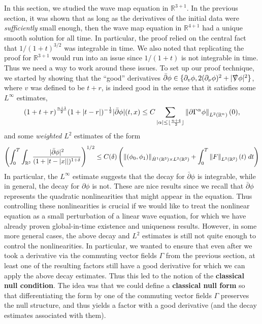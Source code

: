 \documentclass{article}
\begin{document}
	In this section, we studied the wave map equation in $\mathbb{R}^{3 + 1}$. In the previous section, it was shown that as long as the derivatives of the initial data were \textit{sufficiently} small enough, then the wave map equation in $\mathbb{R}^{4 + 1}$ had a unique smooth solution for all time. In particular, the proof relied on the central fact that $1/(1 + t)^{3/2}$ was integrable in time. We also noted that replicating the proof for $\mathbb{R}^{3 + 1}$ would run into an issue since $1/(1 + t)$ is not integrable in time. Thus we need a way to work around these issues. To set up our proof technique, we started by showing that the ``good'' derivatives $\bar{\partial}\phi \in \{\partial_{v}\phi, 2(\partial_{\nu}\phi)^{2} + |\slashed{\nabla}\phi|^{2}\}$, where $v$ was defined to be $t + r$, is indeed good in the sense that it satisfies some $L^{\infty}$ estimates, 
	\begin{equation*}
		(1 + t + r)^{\frac{n + 1}{2}}(1 + |t - r|)^{-\frac{1}{2}}|\bar{\partial}\phi|(t, x) \leq C \sum_{|\alpha|\leq \lfloor \frac{n + 4}{2}\rfloor}\left\Vert \partial\Gamma^{\alpha}\phi \right\Vert_{L^{2}(\mathbb{R}^{n})}(0), 
	\end{equation*} 
	and some \textit{weighted} $L^{2}$ estimates of the form 
	\begin{equation*}
		\left(\int_{0}^{T}\int_{\mathbb{R}^{3}}\frac{|\bar\partial\phi|^{2}}{(1 + |t - |x||)^{1 + \delta}}\right)^{1/2}\leq C(\delta)\left(\left\Vert (\phi_{0}, \phi_{1}) \right\Vert_{\dot{H}^{1}(\mathbb{R}^{3}) \times L^{2}(\mathbb{R}^{3})} + \int_{0}^{T}\left\Vert F \right\Vert_{L^{2}(\mathbb{R}^{3})}(t)\;dt\right)
	\end{equation*}  
	In particular, the $L^{\infty}$ estimate suggests that the decay for $\bar{\partial}\phi$ is integrable, while in general, the decay for $\partial \phi$ is not. These are nice results since we recall that $\bar{\partial}\phi$ represents the quadratic nonlinearities that might appear in the equation. Thus controlling these nonlinearities is crucial if we would like to treat the nonlinear equation as a small perturbation of a linear wave equation, for which we have already proven global-in-time existence and uniqueness results. However, in some more general cases, the above decay and $L^{2}$ estimates is still not quite enough to control the nonlinearities. In particular, we wanted to ensure that even after we took a derivative via the commuting vector fields $\Gamma$ from the previous section, at least one of the resulting factors still have a good derivative for which we can apply the above decay estimates. Thus this led to the notion of the \textbf{classical null condition}. The idea was that we could define a \textbf{classical null form} so that differentiating the form by one of the commuting vector fields $\Gamma$ preserves the null structure, and thus yields a factor with a good derivative (and the decay estimates associated with them). 
	\newpage 
\end{document}

